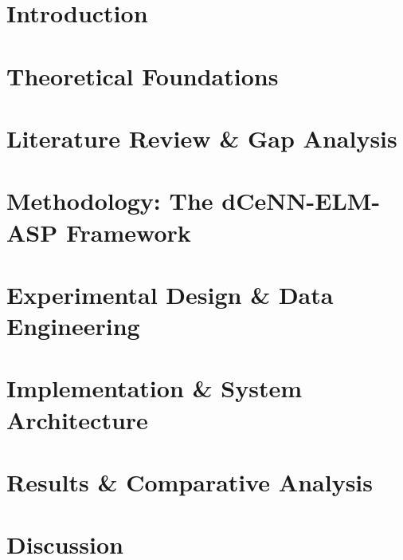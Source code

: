 \documentclass[12pt]{report}
\begin{document}
 
\pagestyle{fancy}
\rfoot{\thepage}
\cfoot{}






 
\newpage
\tableofcontents
\listoffigures
\listoftables
\clearpage


\pagestyle{plain}

\chapter{Introduction}
\label{sec:intro}


\chapter{Theoretical Foundations}
\label{sec:Slimemold}


\chapter{ Literature Review \& Gap Analysis}
\label{sec:relatedwork}


\chapter{Methodology: The dCeNN-ELM-ASP Framework}
\label{sec:methods}


\chapter{Experimental Design \& Data Engineering}
\label{sec:implementation}


\chapter{Implementation \& System Architecture}
\label{sec:experiments}


\chapter{Results \& Comparative Analysis}
\label{sec:results}


\chapter{Discussion}
\label{sec:discussion}

\end{document}
